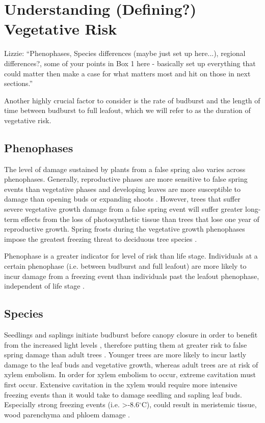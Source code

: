 \documentclass{article}\usepackage[]{graphicx}\usepackage[]{color}
\begin{document}
\section*{Understanding (Defining?) Vegetative Risk}
Lizzie: ``Phenophases, Species differences (maybe just set up here...), regional differences?, some of your points in Box 1 here - basically set up everything that could matter then make a case for what matters most and hit on those in next sections.''

Another highly crucial factor to consider is the rate of budburst and the length of time between budburst to full leafout, which we will refer to as the duration of vegetative risk. %

\subsection*{Phenophases}
The level of damage sustained by plants from a false spring also varies across phenophases. Generally, reproductive phases are more sensitive to false spring events than vegetative phases and developing leaves are more susceptible to damage than opening buds or expanding shoots \citep{Lenz2013,Augspurger2009}. However, trees that suffer severe vegetative growth damage from a false spring event will suffer greater long-term effects from the loss of photosynthetic tissue than trees that lose one year of reproductive growth. Spring frosts during the vegetative growth phenophases impose the greatest freezing threat to deciduous tree species \citep{Sakai1987}.

Phenophase is a greater indicator for level of risk than life stage. Individuals at a certain phenophase (i.e. between budburst and full leafout) are more likely to incur damage from a freezing event than individuals past the leafout phenophase, independent of life stage \citep{Augspurger2009,Vitasse2014}.

\subsection*{Species}
Seedlings and saplings initiate budburst before canopy closure in order to benefit from the increased light levels \citep{Augspurger2008}, therefore putting them at greater risk to false spring damage than adult trees \citep{Vitasse2014}. Younger trees are more likely to incur lastly damage to the leaf buds and vegetative growth, whereas adult trees are at risk of xylem embolism. In order for xylem embolism to occur, extreme cavitation must first occur. Extensive cavitation in the xylem would require more intensive freezing events than it would take to damage seedling and sapling leaf buds. Especially strong freezing events (i.e. >-8.6$^{\circ}$C), could result in meristemic tissue, wood parenchyma and phloem damage \citep{Lenz2013, Augspurger2011, Sakai1987}.  
\end{document}
